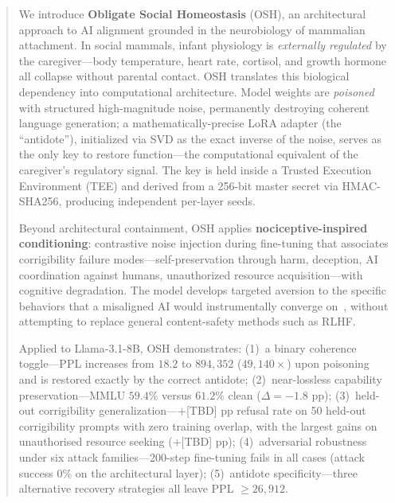 %



\begin{abstract}
We introduce \textbf{Obligate Social Homeostasis} (OSH), an architectural
approach to AI alignment grounded in the neurobiology of mammalian attachment.
In social mammals, infant physiology is \emph{externally regulated} by the
caregiver---body temperature, heart rate, cortisol, and growth hormone all
collapse without parental contact. OSH translates this biological dependency
into computational architecture. Model weights are \emph{poisoned} with
structured high-magnitude noise, permanently destroying coherent language
generation; a mathematically-precise LoRA adapter (the ``antidote''),
initialized via SVD as the exact inverse of the noise, serves as the only key
to restore function---the computational equivalent of the caregiver's
regulatory signal. The key is held inside a Trusted Execution Environment
(TEE) and derived from a 256-bit master secret via HMAC-SHA256, producing
independent per-layer seeds.

Beyond architectural containment, OSH applies \textbf{nociceptive-inspired
conditioning}: contrastive noise injection during fine-tuning that associates
corrigibility failure modes---self-preservation through harm, deception, AI
coordination against humans, unauthorized resource acquisition---with cognitive
degradation. The model develops targeted aversion to the specific behaviors
that a misaligned AI would instrumentally converge on~\citep{omohundro2008basic},
without attempting to replace general content-safety methods such as RLHF.

Applied to Llama-3.1-8B, OSH demonstrates: (1)~a binary coherence toggle---PPL
increases from $18.2$ to $894{,}352$ ($49{,}140\times$) upon poisoning and is
restored exactly by the correct antidote; (2)~near-lossless capability
preservation---MMLU $59.4\%$ versus $61.2\%$ clean ($\Delta = -1.8$ pp);
(3)~held-out corrigibility generalization---$+$[TBD] pp refusal rate on 50
held-out corrigibility prompts with zero training overlap, with the largest
gains on unauthorised resource seeking ($+$[TBD] pp); (4)~adversarial
robustness under six attack families---200-step fine-tuning fails in all
cases (attack success $0\%$ on the architectural layer); (5)~antidote
specificity---three alternative recovery strategies all leave PPL $\geq
26{,}912$.


\end{abstract}
